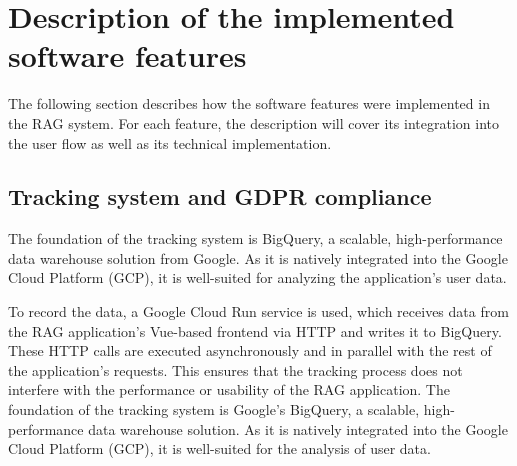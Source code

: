 \documentclass[
	english,
	ruledheaders=section,%
	class=report,%
	thesis={type=bachelor},%
	accentcolor=1b,%
	custommargins=true,%
	marginpar=false,%
	parskip=half-,%
	fontsize=11pt,%
	DIV=14,
]{tudapub}
\begin{document}
\section{Description of the implemented software features}
The following section describes how the software features were implemented in the RAG system. For each feature, the description will cover its integration into the user flow as well as its technical implementation.
\subsection{Tracking system and GDPR compliance}
The foundation of the tracking system is BigQuery, a scalable, high-performance data warehouse solution from Google. As it is natively integrated into the Google Cloud Platform (GCP), it is well-suited for analyzing the application's user data.

To record the data, a Google Cloud Run service is used, which receives data from the RAG application's Vue-based frontend via HTTP and writes it to BigQuery. These HTTP calls are executed asynchronously and in parallel with the rest of the application's requests. This ensures that the tracking process does not interfere with the performance or usability of the RAG application.
The foundation of the tracking system is Google's BigQuery, a scalable, high-performance data warehouse solution. As it is natively integrated into the Google Cloud Platform (GCP), it is well-suited for the analysis of user data.
\end{document}

